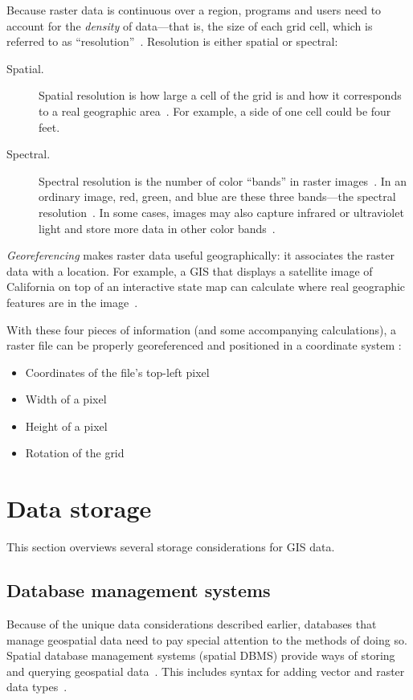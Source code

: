 Because raster data is continuous over a region, programs and users need to account for the \textit{density} of data---that is, the size of each grid cell, which is referred to as ``resolution''~\cite{gentle_intro}. Resolution is either spatial or spectral:

\begin{description}
  \item[Spatial.] Spatial resolution is how large a cell of the grid is and how it corresponds to a real geographic area~\cite{gentle_intro}. For example, a side of one cell could be four feet.
  \item[Spectral.] Spectral resolution is the number of color ``bands'' in raster images~\cite{gentle_intro}. In an ordinary image, red, green, and blue are these three bands---the spectral resolution~\cite{gentle_intro}. In some cases, images may also capture infrared or ultraviolet light and store more data in other color bands~\cite{gentle_intro}.
\end{description}

\textit{Georeferencing} makes raster data useful geographically: it associates the raster data with a location. For example, a GIS that displays a satellite image of California on top of an interactive state map can calculate where real geographic features are in the image~\cite{gentle_intro}.

With these four pieces of information (and some accompanying calculations), a raster file can be properly georeferenced and positioned in a coordinate system \cite{gentle_intro}:

\begin{itemize}
  \item Coordinates of the file's top-left pixel
  \item Width of a pixel
  \item Height of a pixel
  \item Rotation of the grid
\end{itemize}

\section{Data storage}
\label{storage}
This section overviews several storage considerations for GIS data.

\subsection{Database management systems}
Because of the unique data considerations described earlier, databases that manage geospatial data need to pay special attention to the methods of doing so. Spatial database management systems (spatial DBMS) provide ways of storing and querying geospatial data~\cite{Boundless}. This includes syntax for adding vector and raster data types~\cite{Boundless}.

